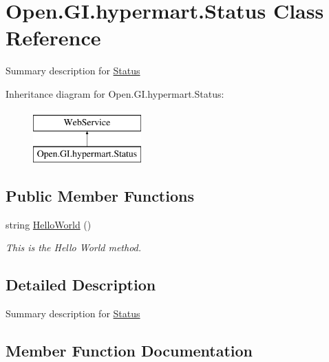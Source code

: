 \hypertarget{class_open_1_1_g_i_1_1hypermart_1_1_status}{}\section{Open.\+G\+I.\+hypermart.\+Status Class Reference}
\label{class_open_1_1_g_i_1_1hypermart_1_1_status}


Summary description for \hyperlink{class_open_1_1_g_i_1_1hypermart_1_1_status}{Status}  


Inheritance diagram for Open.\+G\+I.\+hypermart.\+Status\+:\begin{figure}[H]
\begin{center}
\leavevmode
\includegraphics[height=2.000000cm]{class_open_1_1_g_i_1_1hypermart_1_1_status}
\end{center}
\end{figure}
\subsection*{Public Member Functions}
\begin{DoxyCompactItemize}
\item 
string \hyperlink{class_open_1_1_g_i_1_1hypermart_1_1_status_a73a11d6869226091bd66017995dfabef}{Hello\+World} ()
\begin{DoxyCompactList}\small\item\em This is the Hello World method. \end{DoxyCompactList}\end{DoxyCompactItemize}


\subsection{Detailed Description}
Summary description for \hyperlink{class_open_1_1_g_i_1_1hypermart_1_1_status}{Status} 



\subsection{Member Function Documentation}
\hypertarget{class_open_1_1_g_i_1_1hypermart_1_1_status_a73a11d6869226091bd66017995dfabef}{}\label{class_open_1_1_g_i_1_1hypermart_1_1_status_a73a11d6869226091bd66017995dfabef} 
